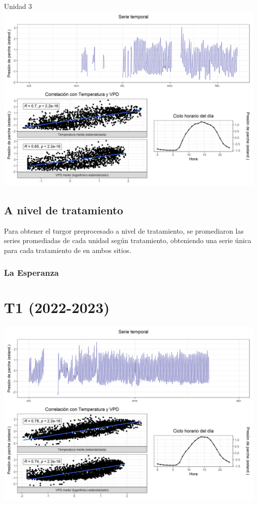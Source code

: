 \documentclass[
  letterpaper,
  DIV=11,
  numbers=noendperiod]{scrreprt}
\begin{document}
Unidad 3
\includegraphics{figuras/04_turgor_unidad/2023_2024_Rio_Claro_T4_Unidad_3.png}

\section{A nivel de tratamiento}\label{a-nivel-de-tratamiento}

Para obtener el turgor preprocesado a nivel de tratamiento, se
promediaron las series promediadas de cada unidad según tratamiento,
obteniendo una serie única para cada tratamiento de en ambos sitios.

\subsection{La Esperanza}\label{la-esperanza-5}

\chapter{T1 (2022-2023)}

\includegraphics{figuras/05_turgor_tratamiento/2022_2023_La_Esperanza_T1.png}
\end{document}
